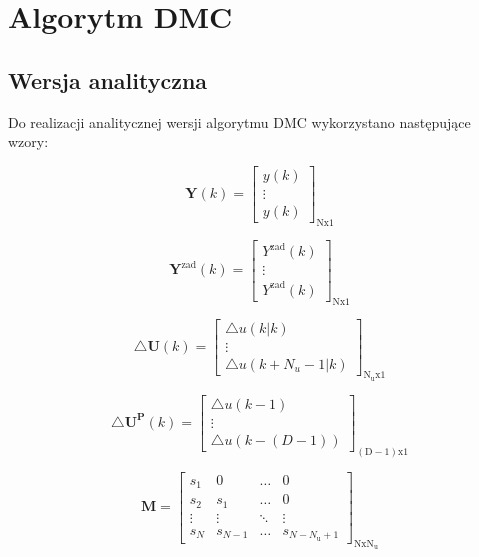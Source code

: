 

\chapter{Algorytm DMC}
\section{Wersja analityczna}
Do realizacji analitycznej wersji algorytmu DMC wykorzystano następujące wzory:

\begin{equation}
\boldsymbol{Y}(k)=\left[
\begin{array}{c}
y(k)\\
\vdots\\
y(k)
\end{array}
\right]_{\mathrm{Nx1}}
\label{ym}
\end{equation}

\begin{equation}
\boldsymbol{Y}^{\mathrm{zad}}(k)=\left[
\begin{array}{c}
Y^{\mathrm{zad}}(k)\\
\vdots\\
Y^{\mathrm{zad}}(k)
\end{array}
\right]_{\mathrm{Nx1}}
\label{yzadm}
\end{equation}

\begin{equation}
\triangle\boldsymbol{U}(k)=\left[
\begin{array}{c}
\triangle u(k|k)\\
\vdots\\
\triangle u(k+N_u -1 |k)
\end{array}
\right]_{\mathrm{N_ux1}}
\label{dUm}
\end{equation}

\begin{equation}
\triangle\boldsymbol{U^P}(k)=\left[
\begin{array}{c}
\triangle u(k-1)\\
\vdots\\
\triangle u(k-(D-1))
\end{array}
\right]_{\mathrm{(D-1)x1}}
\label{dUPm}
\end{equation}

\begin{equation}
\boldsymbol{M}=\left[
\begin{array}
{cccc}
s_{1} & 0 & \ldots & 0\\
s_{2} & s_{1} & \ldots & 0\\
\vdots & \vdots & \ddots & \vdots\\
s_{N} & s_{N-1} & \ldots &  s_{N-N_{\mathrm{u}}+1}
\end{array}
\right]_{\mathrm{NxN_u}}
\label{Mm}
\end{equation}

